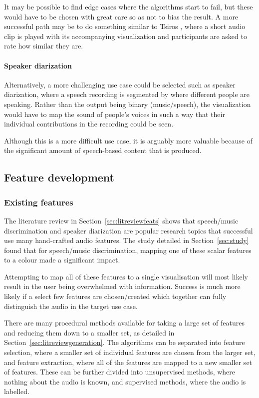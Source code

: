 It may be possible to find edge cases where the algorithms start to fail, but
these would have to be chosen with great care so as not to bias the result. A
more successful path may be to do something similar to Tsiros
\cite{Tsiros2014}, where a short audio clip is played with its accompanying
visualization and participants are asked to rate how similar they are.

\paragraph{Speaker diarization}
Alternatively, a more challenging use case could be selected such as speaker
diarization, where a speech recording is segmented by where different people
are speaking. Rather than the output being binary (music/speech), the
visualization would have to map the sound of people's voices in such a way that
their individual contributions in the recording could be seen.

Although this is a more difficult use case, it is arguably more valuable
because of the significant amount of speech-based content that is produced.

\subsection{Feature development}\label{sec:planfeats}

\subsubsection{Existing features}\label{sec:planfeatsexist}
The literature review in Section~\ref{sec:litreviewfeats} shows that
speech/music discrimination and speaker diarization are popular research topics
that successful use many hand-crafted audio features. The study detailed in
Section~\ref{sec:study} found that for speech/music discrimination, mapping one
of these scalar features to a colour made a significant impact.

Attempting to map all of these features to a single visualisation will most
likely result in the user being overwhelmed with information. Success is much
more likely if a select few features are chosen/created which together can
fully distinguish the audio in the target use case.

There are many procedural methods available for taking a large set of features
and reducing them down to a smaller set, as detailed in
Section~\ref{sec:litreviewgeneration}. The algorithms can be separated into
feature selection, where a smaller set of individual features are chosen from
the larger set, and feature extraction, where all of the features are mapped to
a new smaller set of features. These can be further divided into unsupervised
methods, where nothing about the audio is known, and supervised methods, where
the audio is labelled.

